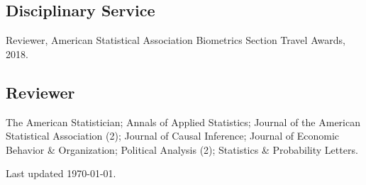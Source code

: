 \documentclass[10pt,letterpaper]{article}
\newenvironment{infolist}{
	\begin{list}{}{
		\setlength{\parskip}{0pt}
		\setlength{\itemsep}{4pt}
		\setlength{\parsep}{0.3em}
		\setlength{\leftmargin}{1.6em}
		\setlength{\labelwidth}{0pt}
		}
	}{
\end{list}
}
\newcommand{\infoitem}[1]{\item {#1}}
\begin{document}
	\subsection*{Disciplinary Service}

	\begin{infolist}
		\infoitem{Reviewer, American Statistical Association Biometrics Section Travel Awards, 2018.}
	\end{infolist}

	\subsection*{Reviewer}

	\begin{infolist}
		\infoitem{The American Statistician; Annals of Applied Statistics; Journal of the American Statistical Association (2); Journal of Causal Inference; Journal of Economic Behavior \& Organization; Political Analysis (2); Statistics \& Probability Letters.}
	\end{infolist}

	\bigskip
	{\small Last updated \today.}
\end{document}
